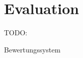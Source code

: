 \chapter{Evaluation}
\label{chapter:evaluation}

TODO:

Bewertungssystem

\cite{2022.Glicko2}
\cite{2024.ChessRatingSystems}
